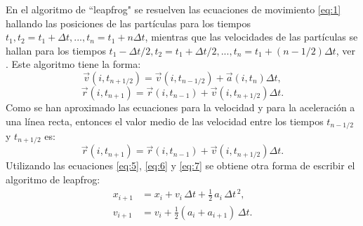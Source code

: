 En el algoritmo de ``leapfrog" se resuelven las ecuaciones de movimiento \eqref{eq:1} hallando las posiciones de las part\'{i}culas para los tiempos $t_1,t_2=t_1+\Delta t,...,t_n=t_{1}+n\Delta t$, mientras que las velocidades de las part\'{i}culas se hallan para los tiempos $t_1-\Delta t/2,t_2=t_1+\Delta t/2,...,t_n=t_{1}+(n-1/2)\Delta t$, ver \cite{Mazur1997CommonRevisited}.  Este algoritmo tiene la forma:
\begin{equation}\label{eq:11}
\vec{v}{(i,t_{n+1/2})}=\vec{v}{(i,t_{n-1/2})}+\vec{a}{(i,t_{n})}\Delta t,
\end{equation}
\begin{equation}\label{eq:12}
\vec{r}{(i,t_{n+1})}=\vec{r}{(i,t_{n-1})}+\vec{v}{(i,t_{n+1/2})}\Delta t.
\end{equation}
Como se han aproximado las ecuaciones para la velocidad y para la aceleraci\'{o}n a una l\'{i}nea recta, entonces el valor medio de las velocidad entre los tiempos $t_{n-1/2}$ y $t_{n+1/2}$ es:
\begin{equation}\label{eq:13}
\vec{r}{(i,t_{n+1})}=\vec{r}{(i,t_{n-1})}+\vec{v}{(i,t_{n+1/2})}\Delta t.
\end{equation}
Utilizando las ecuaciones \eqref{eq:5}, \eqref{eq:6} y \eqref{eq:7} se obtiene otra forma de escribir el algoritmo de leapfrog:
\begin{eqnarray}
  x_{i+1} &= x_i + v_i\, \Delta t + \tfrac{1}{2}\,a_i\, \Delta t^{\,2}, \\
  v_{i+1} &= v_i + \tfrac{1}{2}(a_i + a_{i+1})\,\Delta t.
\end{eqnarray}

